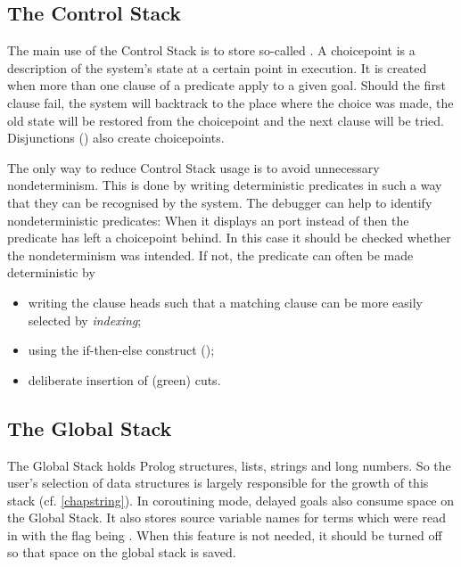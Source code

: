 \subsection{The Control Stack\label{controlstack}}
The main use of the Control Stack is to store so-called
.
A choicepoint is a description of the system's state at a certain point
in execution.
It is created when more than one clause of a predicate apply to a given goal.
Should the first clause fail, the system will backtrack
to the place where the choice was made, the old state will be restored
from the choicepoint and the next clause will be tried.
Disjunctions () also create
choicepoints.

The only way to reduce Control Stack usage is to avoid unnecessary
nondeterminism.
This is done by writing deterministic predicates in such a way that they
can be recognised by the system.
The debugger can help to identify nondeterministic predicates:
When it displays an  port instead of  then the
predicate
has left a choicepoint behind.
In this case it should be checked whether the nondeterminism was intended.
If not, the predicate can often be made deterministic by
\begin{itemize}
\item writing the clause heads such that a matching clause can be more
easily selected by \emph{indexing};
\item using the if-then-else construct ();
\item deliberate insertion of (green) cuts.
\end{itemize}


\subsection{The Global Stack}
The Global Stack holds Prolog structures, lists, strings and long numbers.
So the user's selection of data structures is largely responsible
for the growth of this stack (cf. \ref{chapstring}).
In coroutining mode, delayed goals also consume space on the Global Stack.
It also stores source variable names for terms which
were read in with the flag  being .
When this feature is not needed, it should be turned off
so that space on the global stack is saved.

